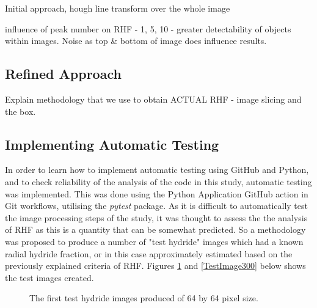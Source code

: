 \documentclass{article}
\begin{document}

Initial approach, hough line transform over the whole image

influence of peak number on RHF - 1, 5, 10 - greater detectability of objects within images.
Noise as top \& bottom of image does influence results.

\subsection{Refined Approach}
Explain methodology that we use to obtain ACTUAL RHF - image slicing and the box.

\subsection{Implementing Automatic Testing}
In order to learn how to implement automatic testing using GitHub and Python, and to check reliability of the analysis of the code in this study, automatic testing was implemented. This was done using the Python Application GitHub action in Git workflows, utilising the \textit{pytest} package. As it is difficult to automatically test the image processing steps of the study, it was thought to assess the the analysis of RHF as this is a quantity that can be somewhat predicted. So a methodology was proposed to produce a number of "test hydride" images which had a known radial hydride fraction, or in this case approximately estimated based on the previously explained criteria of RHF. Figures \ref{TestImages64} and \ref{TestImage300} below shows the test images created.

\begin{figure}[h]
		\begin{center}
		\hspace{6pt} 
		\caption{The first test hydride images produced of 64 by 64 pixel size.}
		\label{TestImages64}
		\end{center}
	\end{figure}
\end{document}
